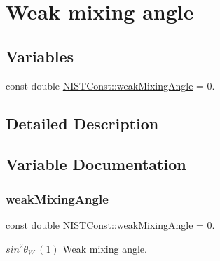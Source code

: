 \hypertarget{group___weak_mixing_angle}{}\section{Weak mixing angle}
\label{group___weak_mixing_angle}
\subsection*{Variables}
\begin{DoxyCompactItemize}
\item 
const double \hyperlink{group___weak_mixing_angle_gaf4037fe32df08c9c7eccd8487b5eab34}{N\+I\+S\+T\+Const\+::weak\+Mixing\+Angle} = 0.
\end{DoxyCompactItemize}


\subsection{Detailed Description}


\subsection{Variable Documentation}
\mbox{\label{group___weak_mixing_angle_gaf4037fe32df08c9c7eccd8487b5eab34}} 
\subsubsection{\texorpdfstring{weak\+Mixing\+Angle}{weakMixingAngle}}
{\footnotesize\ttfamily const double N\+I\+S\+T\+Const\+::weak\+Mixing\+Angle = 0.}

$sin^2 \theta_W \ (1)$ Weak mixing angle. 